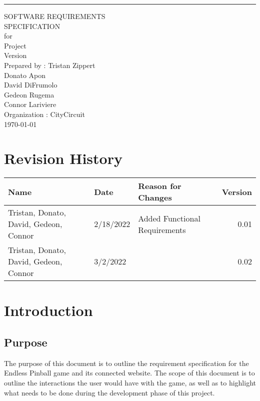 \documentclass[11pt]{article}
\date{}
\title{}
\begin{document}
\begin{flushright}
    \rule{16cm}{5pt}\vskip1cm
    \begin{bfseries}
        \Huge{SOFTWARE REQUIREMENTS\\ SPECIFICATION}\\
        \vspace{1.5cm}
        for\\
        \vspace{1.5cm}
        Project\\
        \vspace{1.5cm}
        \LARGE{Version \myversion}\\
        \vspace{1.5cm}
        Prepared by : Tristan Zippert\\
    Donato Apon \\
     David DiFrumolo\\
       Gedeon Rugema\\
    Connor Lariviere\\ 
        \vspace{1.5cm}
        Organization : CityCircuit\\
        \vspace{1.5cm}
        \today\\
    \clearpage
    \end{bfseries}
\end{flushright}
\tableofcontents
\section*{Revision History}
\label{sec:org9b34e07}
\begin{center}
\begin{tabular}{lllr}
Name & Date & Reason for Changes & Version\\
\hline
Tristan, Donato, David, Gedeon, Connor & 2/18/2022 & Added Functional Requirements & 0.01\\
Tristan, Donato, David, Gedeon, Connor & 3/2/2022 &  & 0.02\\
\end{tabular}
\end{center}
\section{Introduction}
\label{sec:orga38c260}
\subsection{Purpose}
\label{sec:orgc2e2695}
The purpose of this document is to outline the requirement specification for the Endless Pinball game and its connected website. The scope of this document is to outline the interactions the user would have with the game, as well as to highlight what needs to be done during the development phase of this project. 
\end{document}
